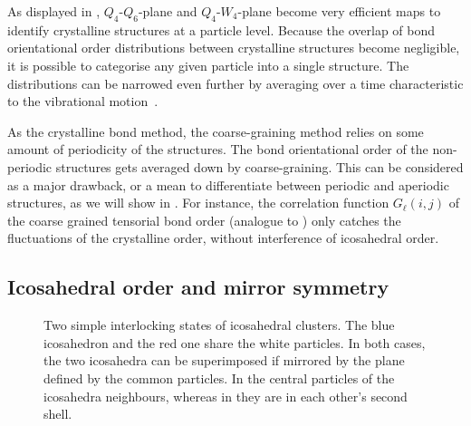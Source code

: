 As displayed in , $Q_4$-$Q_6$-plane and $Q_4$-$W_4$-plane become very efficient maps to identify crystalline structures at a particle level. Because the overlap of bond orientational order distributions between crystalline structures become negligible, it is possible to categorise any given particle into a single structure. The distributions can be narrowed even further by averaging over a time characteristic to the vibrational motion~\citep{tanaka2010critical}.

As the crystalline bond method, the coarse-graining method relies on some amount of periodicity of the structures. The bond orientational order of the non-periodic structures gets averaged down by coarse-graining. This can be considered as a major drawback, or a mean to differentiate between periodic and aperiodic structures, as we will show in . For instance, the correlation function $G_\ell(i,j)$ of the coarse grained tensorial bond order (analogue to ) only catches the fluctuations of the crystalline order, without interference of icosahedral order.

\subsection{Icosahedral order and mirror symmetry}
\label{sec:ico_mirror}

\begin{figure}
	\centering
	\quad
	\caption{Two simple interlocking states of icosahedral clusters. The blue icosahedron and the red one share the white particles. In both cases, the two icosahedra can be superimposed if mirrored by the plane defined by the common particles. In  the central particles of the icosahedra neighbours, whereas in  they are in each other's second shell.}
	\label{fig:ico_contact}
\end{figure}

